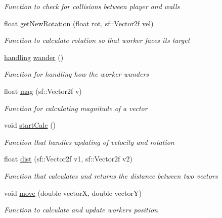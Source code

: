\begin{DoxyCompactItemize}
\begin{DoxyCompactList}\small\item\em Function to check for collisions between player and walls \end{DoxyCompactList}\item 
float \mbox{\hyperlink{class_worker_a3bdb981b147cd2eedcf68f8a6ac1e82c}{get\+New\+Rotation}} (float rot, sf\+::\+Vector2f vel)
\begin{DoxyCompactList}\small\item\em Function to calculate rotation so that worker faces its target \end{DoxyCompactList}\item 
\mbox{\hyperlink{structhandling}{handling}} \mbox{\hyperlink{class_worker_afa1c335f1943af0a28fc7f458c0479b1}{wander}} ()
\begin{DoxyCompactList}\small\item\em Function for handling how the worker wanders \end{DoxyCompactList}\item 
float \mbox{\hyperlink{class_worker_a6c93a3c589595dd0dfeeee21754e961a}{mag}} (sf\+::\+Vector2f v)
\begin{DoxyCompactList}\small\item\em Function for calculating magnitude of a vector \end{DoxyCompactList}\item 
void \mbox{\hyperlink{class_worker_a9bb217423adfa630f0fe3a71e2dc5468}{start\+Calc}} ()
\begin{DoxyCompactList}\small\item\em Function that handles updating of velocity and rotation \end{DoxyCompactList}\item 
float \mbox{\hyperlink{class_worker_aafe153e1510b1d70e5f08d5eff13f275}{dist}} (sf\+::\+Vector2f v1, sf\+::\+Vector2f v2)
\begin{DoxyCompactList}\small\item\em Function that calculates and returns the distance between two vectors \end{DoxyCompactList}\item 
void \mbox{\hyperlink{class_worker_a79945b1af05632250c8f0d905474506d}{move}} (double vectorX, double vectorY)
\begin{DoxyCompactList}\small\item\em Function to calculate and update workers position \end{DoxyCompactList}\end{DoxyCompactItemize}
